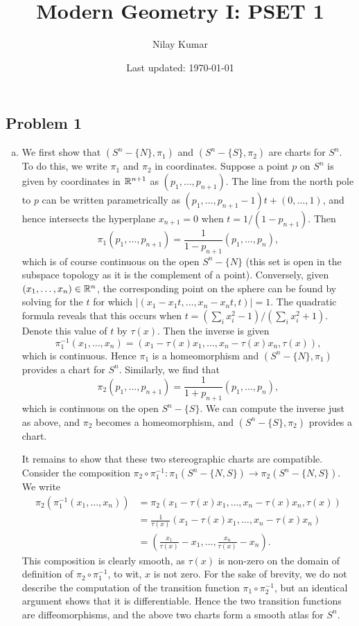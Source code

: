 \documentclass{../mathnotes}
\title{Modern Geometry I: PSET 1}
\author{Nilay Kumar}
\date{Last updated: \today}
\begin{document}
\maketitle

\subsection*{Problem 1}
\begin{enumerate}[(a)]
    \item We first show that $(S^n-\{N\},\pi_1)$ and $(S^n-\{S\},\pi_2)$ are charts for $S^n$.
        To do this, we write $\pi_1$ and $\pi_2$ in coordinates. Suppose a point $p$ on $S^n$
        is given by coordinates in $\mathbb{R}^{n+1}$ as $(p_1,\ldots,p_{n+1})$. The line from the north
        pole to $p$ can be written parametrically as $(p_1,\ldots,p_{n+1}-1)t+(0,\ldots,1)$, and
        hence intersects the hyperplane $x_{n+1}=0$ when $t=1/(1-p_{n+1})$. Then
        \[\pi_1(p_1,\ldots,p_{n+1})=\frac{1}{1-p_{n+1}}(p_1,\ldots,p_n),\]
        which is of course continuous  on the open $S^n-\{N\}$ (this set is open in the subspace
        topology as it is the complement of a point). Conversely, given $(x_1,\ldots,x_n)\in\mathbb{R}^n$,
        the corresponding point on the sphere can be found by solving for the $t$ for which
        $|(x_1-x_1t,\ldots,x_n-x_nt,t)|=1$. The quadratic formula reveals that this occurs when
        $t=(\sum_i x_i^2-1)/(\sum_i x_i^2+1)$. Denote this value of $t$ by $\tau(x)$.
        Then the inverse is given
        \[\pi_1^{-1}(x_1,\ldots,x_n)=(x_1-\tau(x) x_1,\ldots, x_n-\tau(x) x_n,\tau(x)),\]
        which is continuous. Hence $\pi_1$ is a homeomorphism and $(S^n-\{N\},\pi_1)$ provides
        a chart for $S^n$. Similarly, we find that
        \[\pi_2(p_1,\ldots,p_{n+1})=\frac{1}{1+p_{n+1}}(p_1,\ldots,p_n),\]
        which is continuous on the open $S^n-\{S\}$. We can compute the inverse just as above,
        and $\pi_2$ becomes a homeomorphism, and $(S^n-\{S\},\pi_2)$ provides a chart.

        It remains to show that these two stereographic charts are compatible. Consider the
        composition $\pi_2\circ\pi_1^{-1}:\pi_1(S^n-\{N,S\})\to\pi_2(S^n-\{N,S\})$. We write
        \begin{align*}
            \pi_2(\pi_1^{-1}(x_1,\ldots,x_n)) &= \pi_2(x_1-\tau(x)x_1,\ldots,x_n-\tau(x)x_n,\tau(x))\\
            &= \frac{1}{\tau(x)}(x_1-\tau(x)x_1,\ldots,x_n-\tau(x)x_n)\\
            &=\left(\frac{x_1}{\tau(x)}-x_1,\ldots,\frac{x_n}{\tau(x)}-x_n\right).
        \end{align*}
        This composition is clearly smooth, as $\tau(x)$ is non-zero on the domain of definition
        of $\pi_2\circ\pi_1^{-1}$, to wit, $x$ is not zero. For the sake of brevity, we do not describe
        the computation of the transition function $\pi_1\circ\pi_2^{-1}$, but an identical argument shows
        that it is differentiable. Hence the two transition functions are diffeomorphisms,
        and the above two charts form a smooth atlas for $S^n$.


\end{enumerate}
\end{document}
